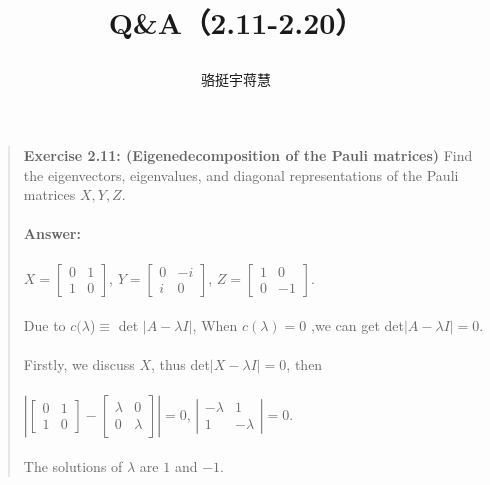 \documentclass[UTF8]{ctexart}
\begin{document}
	\title{\textbf{Q\&A（2.11-2.20）}\\[1ex]\begin{large}
		\end{large}}
	\author{骆挺宇\quad 蒋慧}
	\maketitle
\begin{quote}
\textbf{Exercise 2.11: (Eigenedecomposition of the Pauli matrices)} Find the eigenvectors, eigenvalues, and diagonal representations of the Pauli matrices $X, Y, Z$. \\ \\
\textbf{Answer:}\\ \\
	 \hspace*{0.6cm}$X=\begin{bmatrix}0& 1\\1& 0\end{bmatrix}$,	
	$Y=\begin{bmatrix}0& -i\\i&0\end{bmatrix}$,
	$Z=\begin{bmatrix}1& 0\\0&-1\end{bmatrix}$.\\ \\
	Due to $c(\lambda$)$\equiv$ det $ |A-\lambda I |$, When $ c(\lambda)=0$ ,we can get  det$|A-\lambda I|=0.$ \\ \\ 
	Firstly, we discuss $X$, thus det$|X-\lambda I|=0$, then \\ \\ 
	$\left|\begin{bmatrix}0& 1\\1& 0\end{bmatrix} - \begin{bmatrix}\lambda& 0\\0& \lambda\end{bmatrix}\right|=0$,
	$\left|\begin{array}{cccc} -\lambda& 1\\1&-\lambda \end{array}\right| =0. $ \\  \\
	The solutions of $\lambda$  are $1$ and $-1$.\\

\end{quote}
\end{document}
